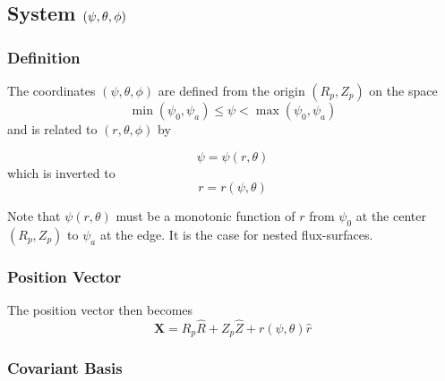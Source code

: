 \subsection{System $\left( \protect\psi,\protect\theta,\protect\phi\right) $}

\subsubsection{Definition}

The coordinates $\left( \psi,\theta,\phi\right) $ are defined from the
origin $\left( R_{p},Z_{p}\right) $ on the space 
\begin{equation*}
\min\left( \psi_{0},\psi_{a}\right) \leq\psi<\max\left( \psi_{0},\psi
_{a}\right)
\end{equation*}
and is related to $\left( r,\theta,\phi\right) $ by

\begin{equation*}
\psi=\psi\left( r,\theta\right)
\end{equation*}
which is inverted to 
\begin{equation*}
r=r\left( \psi,\theta\right)
\end{equation*}

Note that $\psi\left( r,\theta\right) $ must be a monotonic function of $r$
from $\psi_{0}$ at the center $\left( R_{p},Z_{p}\right) $ to $\psi_{a}$ at
the edge. It is the case for nested flux-surfaces.

\subsubsection{Position Vector}

The position vector then becomes 
\begin{equation}
\mathbf{X}=R_{p}\widehat{R}+Z_{p}\widehat{Z}+r\left( \psi,\theta\right) 
\widehat{r}
\end{equation}

\subsubsection{Covariant Basis}

